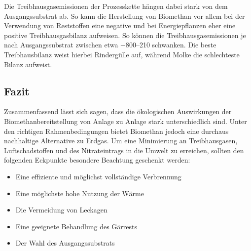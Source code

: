 Die Treibhausgasemissionen der Prozesskette hängen dabei stark von dem Ausgangssubstrat ab. So kann die Herstellung von Biomethan vor allem bei der Verwendung von Reststoffen eine negative und bei Energiepflanzen eher eine positive Treibhausgasbilanz aufweisen. So können die Treibhausgasemissionen je nach Ausgangssubstrat zwischen etwa \SIrange{-800}{210}{\gcoeqmj} schwanken. Die beste Treibhausbilanz weist hierbei Rindergülle auf, während Molke die schlechteste Bilanz aufweist. \parencite{Tonini2016}


\subsection{Fazit}

Zusammenfassend lässt sich sagen, dass die ökologischen Auswirkungen der Biomethanbereitstellung von Anlage zu Anlage stark unterschiedlich sind. Unter den richtigen Rahmenbedingungen bietet Biomethan jedoch eine durchaus nachhaltige Alternative zu Erdgas. Um eine Minimierung an Treibhausgasen, Luftschadstoffen und des Nitrateintrags in die Umwelt zu erreichen, sollten den folgenden Eckpunkte besondere Beachtung geschenkt werden:

\begin{itemize}
	\item Eine effiziente und möglichst vollständige Verbrennung
	\item Eine möglichste hohe Nutzung der Wärme
	\item Die Vermeidung von Leckagen
	\item Eine geeignete Behandlung des Gärrests
	\item Der Wahl des Ausgangssubstrats
\end{itemize}